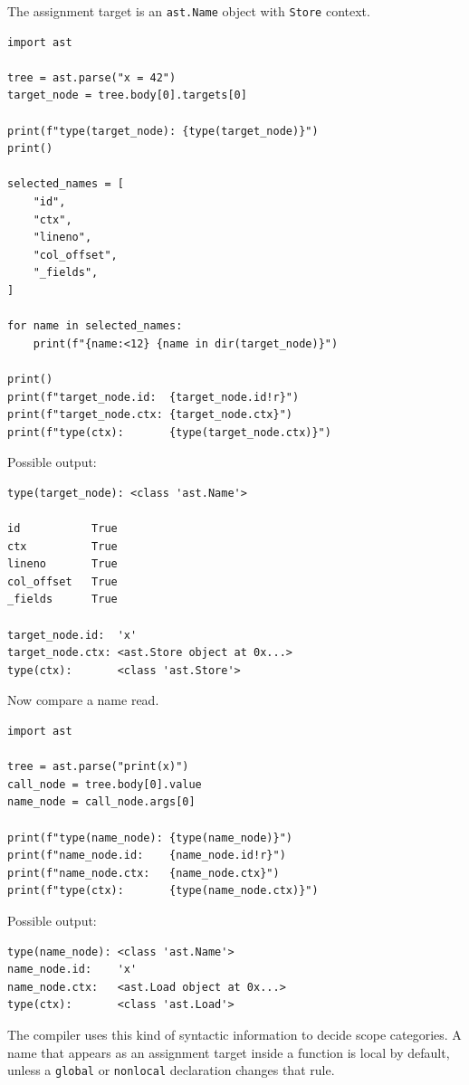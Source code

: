 The assignment target is an \texttt{ast.Name} object with \texttt{Store} context.

\begin{verbatim}
import ast

tree = ast.parse("x = 42")
target_node = tree.body[0].targets[0]

print(f"type(target_node): {type(target_node)}")
print()

selected_names = [
    "id",
    "ctx",
    "lineno",
    "col_offset",
    "_fields",
]

for name in selected_names:
    print(f"{name:<12} {name in dir(target_node)}")

print()
print(f"target_node.id:  {target_node.id!r}")
print(f"target_node.ctx: {target_node.ctx}")
print(f"type(ctx):       {type(target_node.ctx)}")
\end{verbatim}

Possible output:

\begin{verbatim}
type(target_node): <class 'ast.Name'>

id           True
ctx          True
lineno       True
col_offset   True
_fields      True

target_node.id:  'x'
target_node.ctx: <ast.Store object at 0x...>
type(ctx):       <class 'ast.Store'>
\end{verbatim}

Now compare a name read.

\begin{verbatim}
import ast

tree = ast.parse("print(x)")
call_node = tree.body[0].value
name_node = call_node.args[0]

print(f"type(name_node): {type(name_node)}")
print(f"name_node.id:    {name_node.id!r}")
print(f"name_node.ctx:   {name_node.ctx}")
print(f"type(ctx):       {type(name_node.ctx)}")
\end{verbatim}

Possible output:

\begin{verbatim}
type(name_node): <class 'ast.Name'>
name_node.id:    'x'
name_node.ctx:   <ast.Load object at 0x...>
type(ctx):       <class 'ast.Load'>
\end{verbatim}

The compiler uses this kind of syntactic information to decide scope categories. A name that appears as an assignment target inside a function is local by default, unless a \texttt{global} or \texttt{nonlocal} declaration changes that rule.


